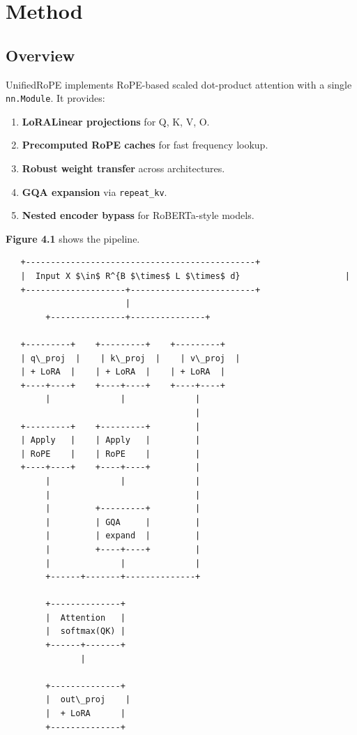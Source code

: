
\section{Method}

\subsection{Overview}

UnifiedRoPE implements RoPE-based scaled dot-product attention with a 
single \texttt{nn.Module}. It provides:

\begin{enumerate}
\item \textbf{LoRALinear projections} for Q, K, V, O.
\item \textbf{Precomputed RoPE caches} for fast frequency lookup.
\item \textbf{Robust weight transfer} across architectures.
\item \textbf{GQA expansion} via \texttt{repeat\_kv}.
\item \textbf{Nested encoder bypass} for RoBERTa-style models.

\end{enumerate}
\textbf{Figure 4.1} shows the pipeline.

\begin{lstlisting}
   +----------------------------------------------+
   |  Input X $\in$ R^{B $\times$ L $\times$ d}                     |
   +--------------------+-------------------------+
                        |
        +---------------+---------------+
                                         
   +---------+    +---------+    +---------+
   | q\_proj  |    | k\_proj  |    | v\_proj  |
   | + LoRA  |    | + LoRA  |    | + LoRA  |
   +----+----+    +----+----+    +----+----+
        |              |              |
                                      |
   +---------+    +---------+         |
   | Apply   |    | Apply   |         |
   | RoPE    |    | RoPE    |         |
   +----+----+    +----+----+         |
        |              |              |
        |                             |
        |         +---------+         |
        |         | GQA     |         |
        |         | expand  |         |
        |         +----+----+         |
        |              |              |
        +------+-------+--------------+
                
        +--------------+
        |  Attention   |
        |  softmax(QK) |
        +------+-------+
               |
                
        +--------------+
        |  out\_proj    |
        |  + LoRA      |
        +--------------+
\end{lstlisting}

